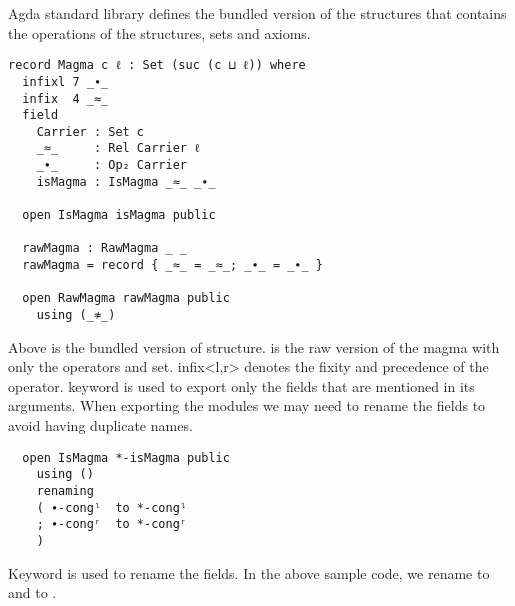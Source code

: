 Agda standard library defines the bundled version of the structures that
contains the operations of the structures, sets and axioms. 
\begin{verbatim}
record Magma c ℓ : Set (suc (c ⊔ ℓ)) where
  infixl 7 _∙_
  infix  4 _≈_
  field
    Carrier : Set c
    _≈_     : Rel Carrier ℓ
    _∙_     : Op₂ Carrier
    isMagma : IsMagma _≈_ _∙_

  open IsMagma isMagma public

  rawMagma : RawMagma _ _
  rawMagma = record { _≈_ = _≈_; _∙_ = _∙_ }

  open RawMagma rawMagma public
    using (_≉_)
\end{verbatim}
Above is the bundled version of  structure.  is
the raw version of the magma with only the operators and set. infix<l,r> denotes
the fixity and precedence of the operator.  keyword is used to
export only the fields that are mentioned in its arguments. When exporting the
modules we may need to rename the fields to avoid having duplicate names.
\begin{verbatim}
  open IsMagma *-isMagma public
    using ()
    renaming
    ( ∙-congˡ  to *-congˡ
    ; ∙-congʳ  to *-congʳ
    )
\end{verbatim} 
Keyword  is used to rename the fields. In the above sample code, we
rename   to  and   to .

